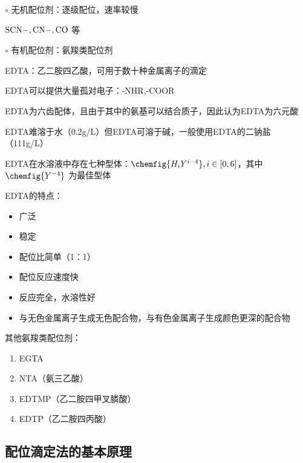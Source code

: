 $\circ$ 无机配位剂：逐级配位，速率较慢
\begin{eg}
    $\ce{SCN-,CN-,CO}$ 等
\end{eg}

$\circ$ 有机配位剂：氨羧类配位剂
\begin{eg}
    EDTA：乙二胺四乙酸，可用于数十种金属离子的滴定

    EDTA可以提供大量孤对电子：-NHR,-COOR

    EDTA为六齿配体，且由于其中的氨基可以结合质子，因此认为EDTA为六元酸
\end{eg}
\begin{notation}
    EDTA难溶于水（0.2g/L）但EDTA可溶于碱，一般使用EDTA的二钠盐（111g/L）

    EDTA在水溶液中存在七种型体：$\chemfig{H_iY^{i-4}} ,i\in [0,6]$，其中$\chemfig{Y^{-4}} $ 为最佳型体
\end{notation}
EDTA的特点：
\begin{itemize}
    \item 广泛
    \item 稳定
    \item 配位比简单（1：1）
    \item 配位反应速度快
    \item 反应完全，水溶性好
    \item 与无色金属离子生成无色配合物，与有色金属离子生成颜色更深的配合物
\end{itemize}
其他氨羧类配位剂：
\begin{enumerate}
    \item EGTA
    \item NTA（氨三乙酸）
    \item EDTMP（乙二胺四甲叉膦酸）
    \item EDTP（乙二胺四丙酸）
\end{enumerate}
\subsection{配位滴定法的基本原理}%
\label{sub:配位滴定法的基本原理}
